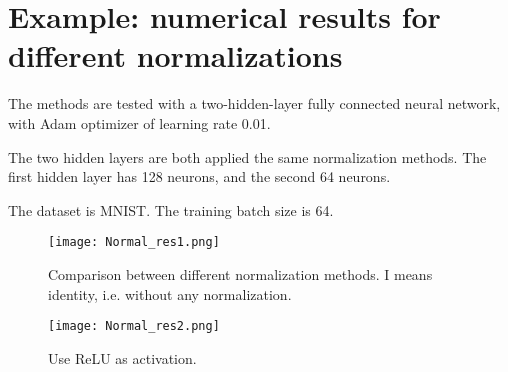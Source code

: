 \section{Example: numerical results for different normalizations}
The methods are tested with a two-hidden-layer fully connected neural network, with Adam optimizer of learning rate 0.01.

The two hidden layers are both applied the same normalization methods. The first hidden layer has 128 neurons, and the second 64 neurons.

The dataset is MNIST. The training batch size is 64.

\begin{figure}[H]
	\center
	\texttt{[image: Normal\_res1.png]}
	\caption{Comparison between different normalization methods. I means identity, i.e. without any normalization.}
\end{figure}

\begin{figure}[H]
	\center
	\texttt{[image: Normal\_res2.png]}
	\caption{Use ReLU as activation.}
\end{figure}